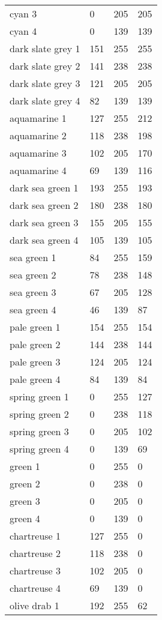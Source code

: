 \begin{center}
\begin{tabular}{llll}
  cyan 3 & 0 & 205 & 205  \\
  cyan 4 & 0 & 139 & 139  \\
  dark slate grey 1 & 151 & 255 & 255  \\
  dark slate grey 2 & 141 & 238 & 238  \\
  dark slate grey 3 & 121 & 205 & 205  \\
  dark slate grey 4 & 82 & 139 & 139  \\
  aquamarine 1 & 127 & 255 & 212  \\
  aquamarine 2 & 118 & 238 & 198  \\
  aquamarine 3 & 102 & 205 & 170  \\
  aquamarine 4 & 69 & 139 & 116  \\
  dark sea green 1 & 193 & 255 & 193  \\
  dark sea green 2 & 180 & 238 & 180  \\
  dark sea green 3 & 155 & 205 & 155  \\
  dark sea green 4 & 105 & 139 & 105  \\
  sea green 1 & 84 & 255 & 159  \\
  sea green 2 & 78 & 238 & 148  \\
  sea green 3 & 67 & 205 & 128  \\
  sea green 4 & 46 & 139 & 87  \\
  pale green 1 & 154 & 255 & 154  \\
  pale green 2 & 144 & 238 & 144  \\
  pale green 3 & 124 & 205 & 124  \\
  pale green 4 & 84 & 139 & 84  \\
  spring green 1 & 0 & 255 & 127  \\
  spring green 2 & 0 & 238 & 118  \\
  spring green 3 & 0 & 205 & 102  \\
  spring green 4 & 0 & 139 & 69  \\
  green 1 & 0 & 255 & 0  \\
  green 2 & 0 & 238 & 0  \\
  green 3 & 0 & 205 & 0  \\
  green 4 & 0 & 139 & 0  \\
  chartreuse 1 & 127 & 255 & 0  \\
  chartreuse 2 & 118 & 238 & 0  \\
  chartreuse 3 & 102 & 205 & 0  \\
  chartreuse 4 & 69 & 139 & 0  \\
  olive drab 1 & 192 & 255 & 62  \\

\end{tabular}
\end{center}
